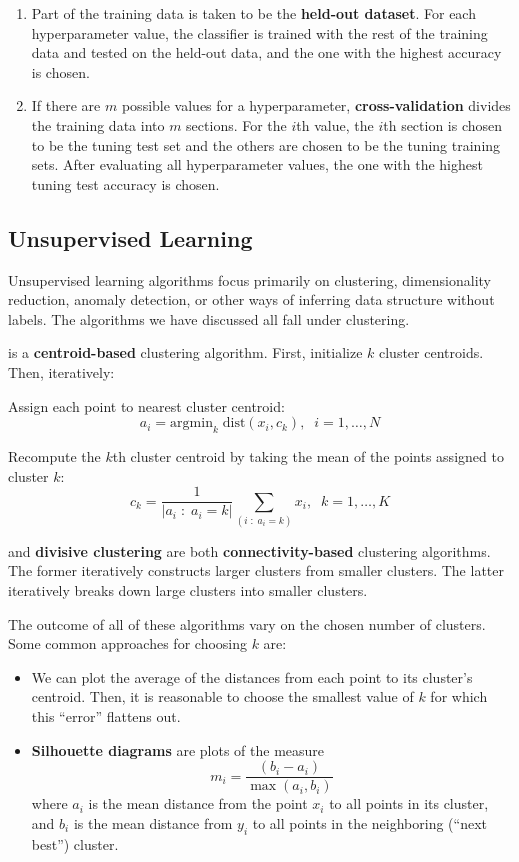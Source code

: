 \documentclass[11pt]{article}
\begin{document}
\begin{enumerate}
    \begin{enumerate}
        \item Part of the training data is taken to be the {\bf{held-out dataset}}. For each hyperparameter value, the classifier is trained with the rest of the training data and tested on the held-out data, and the one with the highest accuracy is chosen.
        \item If there are $m$ possible values for a hyperparameter, {\bf{cross-validation}} divides the training data into $m$ sections. For the $i$th value, the $i$th section is chosen to be the tuning test set and the others are chosen to be the tuning training sets. After evaluating all hyperparameter values, the one with the highest tuning test accuracy is chosen.
    \end{enumerate}
\end{enumerate}


\subsection{Unsupervised Learning}

Unsupervised learning algorithms focus primarily on clustering, dimensionality reduction, anomaly detection, or other ways of inferring data structure without labels. The algorithms we have discussed all fall under clustering.

 is a {\bf{centroid-based}} clustering algorithm. First, initialize $k$ cluster centroids. Then, iteratively:

\noindent Assign each point to nearest cluster centroid:
\[
a_i = \text{argmin}_k \; \text{dist}(x_i, c_k), \;\; i = 1, \dots, N
\]

\noindent Recompute the $k$th cluster centroid by taking the mean of the points assigned to cluster $k$:
\[
c_k = \frac{1}{|a_i \;:\; a_i = k|} \sum_{(i \;:\; a_i = k)} x_i, \;\; k = 1, \dots, K
\]


 and {\bf{divisive clustering}} are both {\bf{connectivity-based}} clustering algorithms. The former iteratively constructs larger clusters from smaller clusters. The latter iteratively breaks down large clusters into smaller clusters.

 The outcome of all of these algorithms vary on the chosen number of clusters. Some common approaches for choosing $k$ are:
\begin{itemize}
    \item We can plot the average of the distances from each point to its cluster's centroid. Then, it is reasonable to choose the smallest value of $k$ for which this ``error'' flattens out.
    \item {\bf{Silhouette diagrams}} are plots of the measure
    \[
    m_i = \frac{(b_i - a_i)}{\max(a_i, b_i)}
    \]
    where $a_i$ is the mean distance from the point $x_i$ to all points in its cluster, and $b_i$ is the mean distance from $y_i$ to all points in the neighboring (``next best'') cluster.
\end{itemize}
\end{document}
